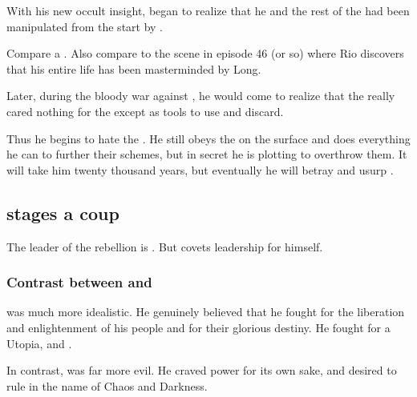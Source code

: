 With his new occult insight, \Azraid began to realize that he and the rest of the \resphain had been manipulated from the start by \Daggerrain. 

Compare a . 
Also compare to the scene in \emph{\JuukenSentaiGekiranger} episode 46 (or so) where Rio discovers that his entire life has been masterminded by Long. 

Later, during the bloody war against \Merkyrah{}, he would come to realize that the \banes{} really cared nothing for the \resphain{} except as tools to use and discard. 

Thus he begins to hate the \banes. 
He still obeys the \banelords{} on the surface and does everything he can to further their schemes, but in secret he is plotting to overthrow them. 
It will take him twenty thousand years, but eventually he will betray and usurp \Banelord{} \Daggerrain. 









\subsection{\Morcariel stages a coup}
The leader of the rebellion is \Damiarch. 
But \Morcariel covets leadership for himself. 





\subsubsection{Contrast between \Damiarch and \Morcariel}
\Damiarch was much more idealistic. 
He genuinely believed that he fought for the liberation and enlightenment of his people and for their glorious destiny. 
He fought for a Utopia, and . 

In contrast, \Morcariel was far more evil. 
He craved power for its own sake, and desired to rule in the name of Chaos and Darkness. 






